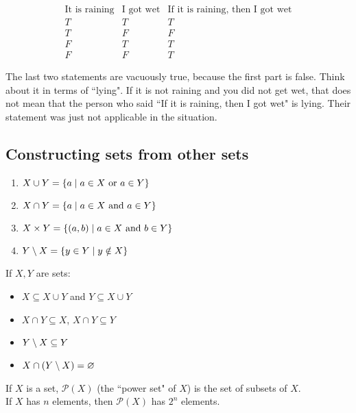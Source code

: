 \documentclass[class=article, crop=false]{standalone}
\begin{document}
  \newpage
  \begin{center}\[\begin{array}{c|c|c}
    \text{It is raining} & \text{I got wet} & \text{If it is raining, then I got wet} \\
    \hline
    T & T & T \\
    T & F & F \\
    F & T & T \\
    F & F & T
  \end{array}\]\end{center}
  The last two statements are vacuously true, because the first part is false. Think about it in terms of ``lying". If it is not raining and you did not get wet, that does not mean that the person who said ``If it is raining, then I got wet" is lying. Their statement was just not applicable in the situation.
  \subsection{Constructing sets from other sets}
  \begin{enumerate}[label=(\roman*)]
    \item $X\cup Y = \left\{a\mid a \in X \text{ or } a \in Y\right\}$
    \item $X\cap Y = \left\{a\mid a\in X \text{ and } a \in Y\right\}$
    \item $X\times Y = \left\{(a, b)\mid a\in X \text{ and } b\in Y\right\}$
    \item $Y \setminus X = \left\{y\in Y\mid y\notin X\right\}$
  \end{enumerate}
   If $X, Y$ are sets:
  \begin{itemize}
    \item $X\subseteq X\cup Y$ and $Y \subseteq X\cup Y$
    \item $X \cap Y \subseteq X$, $X\cap Y\subseteq Y$
    \item $Y\setminus X \subseteq Y$
    \item $X\cap (Y\setminus X) = \varnothing$
  \end{itemize}
   If $X$ is a set, $\mathscr{P}(X)$ (the ``power set" of $X$) is the set of subsets of $X$. \\
   If $X$ has $n$ elements, then $\mathscr{P}(X)$ has $2^n$ elements.
\end{document}
